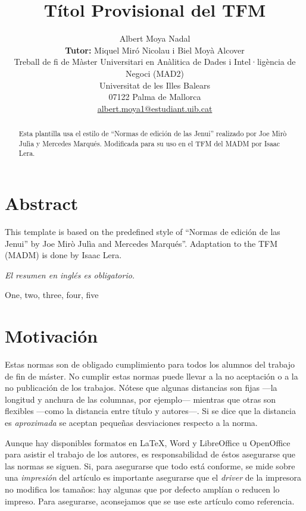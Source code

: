 \documentclass[twocolumn,twoside,a4paper, 10pt]{article}
\title{Títol Provisional del TFM}
\author{\normalsize 
{\large Albert Moya Nadal} \\
 \textbf{Tutor:}  {\large Miquel Miró Nicolau i Biel Moyà Alcover} \\
Treball de fi de Màster Universitari en Anàlitica de Dades i Intel·ligència de Negoci (MAD2)\\
Universitat de les Illes Balears \\
07122 Palma de Mallorca \\
\url{albert.moya1@estudiant.uib.cat}
}
\date{}
\begin{document}
\maketitle
\thispagestyle{empty}



\begin{abstract}
\noindent Esta plantilla usa el estilo de ``Normas de edición de las Jenui'' realizado por Joe Mirò Julìa y Mercedes Marqués. Modificada para su uso en el TFM del MADM por Isaac Lera.

\end{abstract}

\section*{Abstract}
\noindent  This template is based on the predefined style of ``Normas de edición de las Jenui'' by Joe Mirò Julìa and Mercedes Marqués''. Adaptation to the TFM (MADM) is done by Isaac Lera.\par
\noindent  \textit{El resumen en inglés es obligatorio.}


\begin{keywords}
One, two, three, four, five
\end{keywords}

\section{Motivación}

Estas normas son de obligado cumplimiento para todos los alumnos del trabajo de fin de máster. 
 No cumplir estas normas puede llevar a la no aceptación o a la no 
publicación de los trabajos. Nótese que algunas distancias son fijas 
---la longitud y anchura de las columnas, por ejemplo--- mientras que 
otras son flexibles ---como la distancia entre título y autores---. 
Si se dice que la distancia es \emph{aproximada} se aceptan pequeñas 
desviaciones respecto a la norma. 

Aunque hay disponibles formatos en \LaTeX, Word y LibreOffice u OpenOffice para
asistir el trabajo de los autores, es responsabilidad de éstos
asegurarse que las normas se siguen.  Si, para asegurarse que todo
está conforme, se mide sobre una \emph{impresión} del artículo es
importante asegurarse que el \emph{driver} de la impresora no modifica
los tamaños: hay algunas que por defecto amplían o reducen lo impreso.
Para asegurarse, aconsejamos que se use este artículo como referencia.
\end{document}

